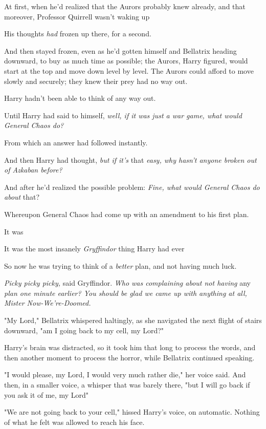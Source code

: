 At first, when he'd realized that the Aurors probably knew already, and that
moreover, Professor Quirrell wasn't waking up{\el}

His thoughts \emph{had} frozen up there, for a second.

And then stayed frozen, even as he'd gotten himself and Bellatrix heading
downward, to buy as much time as possible; the Aurors, Harry figured, would
start at the top and move down level by level. The Aurors could afford to move
slowly and securely; they knew their prey had no way out.

Harry hadn't been able to think of any way out.

Until Harry had said to himself, \emph{well, if it was just a war game, what
would General Chaos do?}

From which an answer had followed instantly.

And then Harry had thought, \emph{but if it's} that \emph{easy, why hasn't
anyone broken out of Azkaban before?}

And after he'd realized the possible problem: \emph{Fine, what would General
Chaos do about} that?

Whereupon General Chaos had come up with an amendment to his first plan.

It was{\el}

It was the most insanely \emph{Gryffindor} thing Harry had ever{\el}

So now he was trying to think of a \emph{better} plan, and not having much luck.

\emph{Picky picky picky,} said Gryffindor. \emph{Who was complaining about not
having} any \emph{plan one minute earlier? You should be glad we came up with
anything at all, Mister Now-We're-Doomed.}

"My Lord," Bellatrix whispered haltingly, as she navigated the next flight of
stairs downward, "am I going back to my cell, my Lord?"

Harry's brain was distracted, so it took him that long to process the words,
and then another moment to process the horror, while Bellatrix continued
speaking.

"I would{\el} please, my Lord, I would very much rather die," her voice
said. And then, in a smaller voice, a whisper that was barely there, "but I
will go back if you ask it of me, my Lord{\el}"

"We are not going back to your cell," hissed Harry's voice, on automatic.
Nothing of what he felt was allowed to reach his face.

